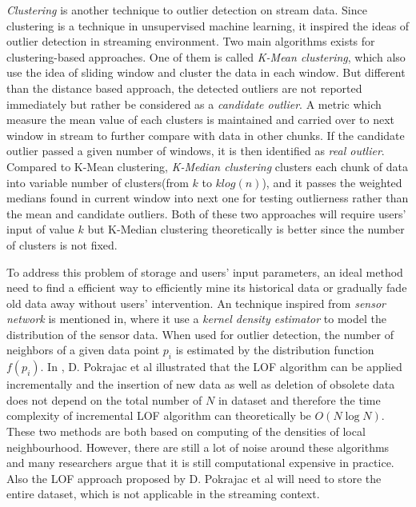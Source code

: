 \documentclass[11pt]{article}       %
\begin{document}
\textit{Clustering} is another technique to outlier detection on stream data. Since clustering is a technique in unsupervised machine learning, it inspired the ideas of outlier detection in streaming environment. Two main algorithms exists for clustering-based approaches. One of them is called \textit{K-Mean clustering}\cite{04666541}, which also use the idea of sliding window and cluster the data in each window. But different than the distance based approach, the detected outliers are not reported immediately but rather be considered as a \textit{candidate outlier}. A metric which measure the mean value of each clusters is maintained and carried over to next window in stream to further compare with data in other chunks. If the candidate outlier passed a given number of windows, it is then identified as \textit{real outlier}. Compared to K-Mean clustering, \textit{K-Median clustering}\cite{DBLP:journals/corr/abs-1002-4003} clusters each chunk of data into variable number of clusters(from $k$ to $k log(n)$), and it passes the weighted medians found in current window into next one for testing outlierness rather than the mean and candidate outliers. Both of these two approaches will require users' input of value $k$ but K-Median clustering theoretically is better since the number of clusters is not fixed. 

To address this problem of storage and users' input parameters, an ideal method need to find a efficient way to efficiently mine its historical data or gradually fade old data away without users' intervention. An technique inspired from \textit{sensor network} is mentioned in\cite{Subramaniam:2006:OOD:1182635.1164145}, where it use a \textit{kernel density estimator} to model the distribution of the sensor data. When used for outlier detection, the number of neighbors of a given data point $p_{i}$ is estimated by the distribution function $f(p_{i})$. In \cite{4221341}, D. Pokrajac et al illustrated that the LOF algorithm can be applied incrementally and the insertion of new data as well as deletion of obsolete data does not depend on the total number of $N$ in dataset and therefore the time complexity of incremental LOF algorithm can theoretically be $O(N\log{N})$. These two methods are both based on computing of the densities of local neighbourhood. However, there are still a lot of noise around these algorithms and many researchers argue that it is still computational expensive in practice. Also the LOF approach proposed by D. Pokrajac et al will need to store the entire dataset, which is not applicable in the streaming context.
\end{document}
